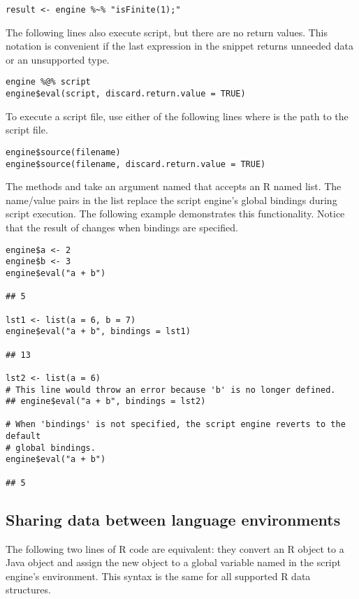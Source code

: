 \begin{verbatim}
result <- engine %~% "isFinite(1);"
\end{verbatim}

The following lines also execute script, but there are no return values. This notation is convenient if the last expression in the snippet returns unneeded data or an unsupported type.

\begin{verbatim}
engine %@% script
engine$eval(script, discard.return.value = TRUE)
\end{verbatim}

\noindent To execute a script file, use either of the following lines where  is the path to the script file.

\begin{verbatim}
engine$source(filename)
engine$source(filename, discard.return.value = TRUE)
\end{verbatim}

The methods  and  take an argument named  that accepts an R named list. The name/value pairs in the list replace the script engine's global bindings during script execution. The following example demonstrates this functionality. Notice that the result of  changes when bindings are specified.

\begin{verbatim}
engine$a <- 2
engine$b <- 3
engine$eval("a + b")

## 5

lst1 <- list(a = 6, b = 7)
engine$eval("a + b", bindings = lst1)

## 13

lst2 <- list(a = 6)
# This line would throw an error because 'b' is no longer defined.
## engine$eval("a + b", bindings = lst2)

# When 'bindings' is not specified, the script engine reverts to the default
# global bindings.
engine$eval("a + b")

## 5
\end{verbatim}

\subsection{Sharing data between language environments}

The following two lines of R code are equivalent: they convert an R object to a Java object and assign the new object to a global variable named  in the script engine's environment. This syntax is the same for all supported R data structures.


